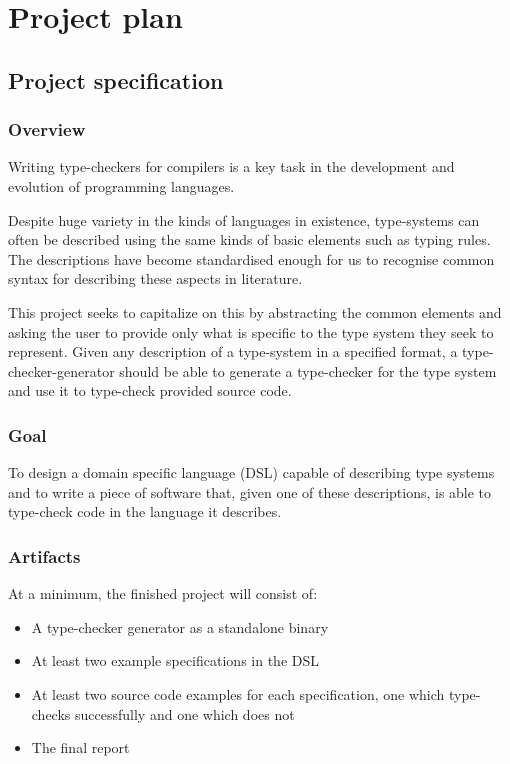 \chapter{Project plan}

\section{Project specification}

  \subsection{Overview}

  Writing type-checkers for compilers is a key task in the
  development and evolution of programming languages.

  Despite huge variety in the kinds of languages in existence,
  type-systems can often be described using the same kinds of
  basic elements such as typing rules. The descriptions have become
  standardised enough for us to recognise common syntax for
  describing these aspects in literature.

  This project seeks to capitalize on this by abstracting
  the common elements and asking the user to provide only what is
  specific to the type system they seek to represent. Given any
  description of a type-system in a specified format, a
  type-checker-generator should be able to generate a
  type-checker for the type system and use it to type-check provided
  source code.
  
  \subsection{Goal}

  To design a domain specific language (DSL) capable of describing type systems and to
  write a piece of software that, given one of these
  descriptions, is able to type-check code in the language
  it describes.

  \subsection{Artifacts}
  \label{section-artifacts}

  At a minimum, the finished project will consist of:

  \begin{itemize}
  \item A type-checker generator as a standalone binary
  \item At least two example specifications in the DSL
  \item At least two source code examples for each
    specification, one which type-checks successfully and one
    which does not
  \item The final report
  \end{itemize}
  
